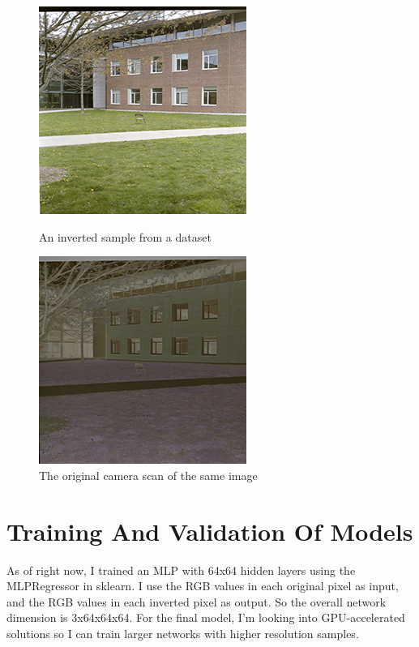 \documentclass[twoside,11pt]{article}
\begin{document}
\begin{figure}
	\centering
	\includegraphics[width=0.6\linewidth]{validate_inverted.png}
	\caption{An inverted sample from a dataset}
	\includegraphics[width=0.6\linewidth]{validate.png}
	\caption{The original camera scan of the same image}
	\label{fig:dataset}
\end{figure}


\section{Training And Validation Of Models}
\label{sec:methods}
As of right now, I trained an MLP with 64x64 hidden layers using the MLPRegressor in sklearn.
I use the RGB values in each original pixel as input, and the RGB values in each inverted pixel as output. 
So the overall network dimension is 3x64x64x64. For the final model,
I'm looking into GPU-accelerated solutions so I can train larger networks
with higher resolution samples.\\
\end{document}
